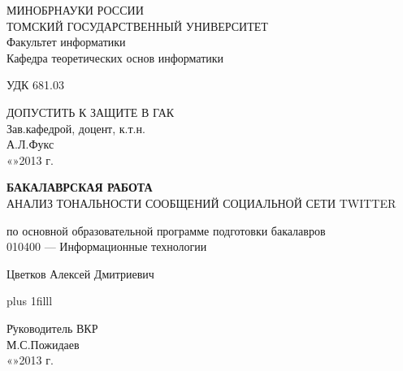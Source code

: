 \normalsize
\thispagestyle{empty}
\begin{center}
МИНОБРНАУКИ РОССИИ\\
ТОМСКИЙ ГОСУДАРСТВЕННЫЙ УНИВЕРСИТЕТ\\
Факультет информатики\\
Кафедра теоретических основ информатики\\
\end{center}

\vspace{0.7cm}

УДК 681.03

\vspace{0.5cm}

\begin{flushright}
ДОПУСТИТЬ К ЗАЩИТЕ В ГАК\\
Зав.кафедрой, доцент, к.т.н.\\
\makebox[3cm]{\hrulefill}А.Л.Фукс\\
«\makebox[0.8cm]{\hrulefill}»\makebox[1.5cm]{\hrulefill}2013 г.\\
\end{flushright}



\begin{center}

\vspace{1.5cm}
{\bf БАКАЛАВРСКАЯ РАБОТА}\\
\vspace{0.5cm}
АНАЛИЗ ТОНАЛЬНОСТИ СООБЩЕНИЙ СОЦИАЛЬНОЙ СЕТИ TWITTER

\vspace{0.5cm}
по основной образовательной программе подготовки бакалавров\\
010400 --- Информационные технологии

\vspace{0.5cm}

Цветков Алексей Дмитриевич


\end{center}

\vskip 0pt plus 1filll

\begin{tabbing}
\hspace{10cm}\=Руководитель ВКР\\
\>\makebox[3cm]{\hrulefill}М.С.Пожидаев\\
\>«\makebox[0.8cm]{\hrulefill}»\makebox[1.5cm]{\hrulefill}2013 г.\\
\end{tabbing}

